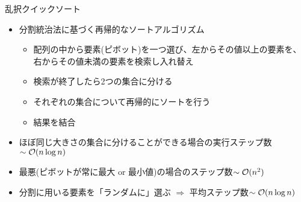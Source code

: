 \begin{frame}[t,fragile]{乱択クイックソート}
  \begin{itemize}
  \item 分割統治法に基づく再帰的なソートアルゴリズム
    \begin{itemize}
    \item 配列の中から要素(ピボット)を一つ選び、左からその値以上の要素を、右からその値未満の要素を検索し入れ替え
    \item 検索が終了したら2つの集合に分ける
    \item それぞれの集合について再帰的にソートを行う
    \item 結果を結合
    \end{itemize}
  \item ほぼ同じ大きさの集合に分けることができる場合の実行ステップ数$\sim {\cal O}(n \log n)$
  \item 最悪(ピボットが常に最大 or 最小値)の場合のステップ数$\sim {\cal O}(n^2)$
  \item 分割に用いる要素を「ランダムに」選ぶ $\Rightarrow$ 平均ステップ数$\sim {\cal O}(n \log n)$
  \end{itemize}
\end{frame}
